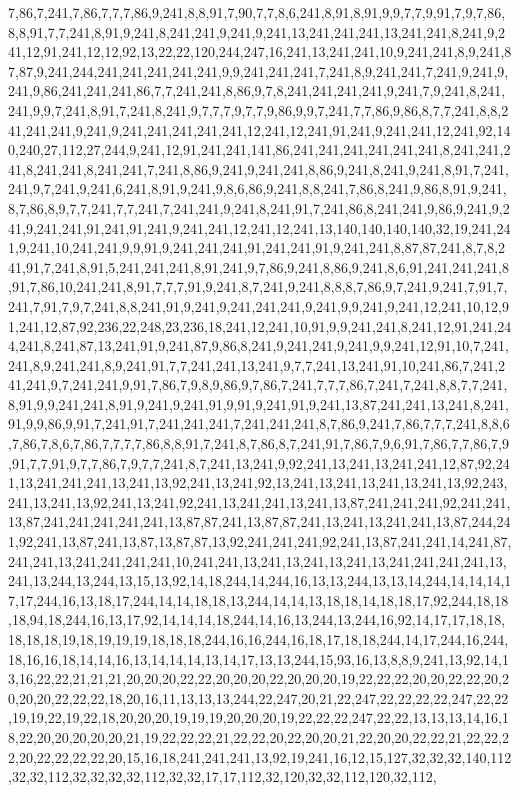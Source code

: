 7,86,7,241,7,86,7,7,7,86,9,241,8,8,91,7,90,7,7,8,6,241,8,91,8,91,9,9,7,7,9,91,7,9,7,86,8,8,91,7,7,241,8,91,9,241,8,241,241,9,241,9,241,13,241,241,241,13,241,241,8,241,9,241,12,91,241,12,12,92,13,22,22,120,244,247,16,241,13,241,241,10,9,241,241,8,9,241,87,87,9,241,244,241,241,241,241,241,9,9,241,241,241,7,241,8,9,241,241,7,241,9,241,9,241,9,86,241,241,241,86,7,7,241,241,8,86,9,7,8,241,241,241,241,9,241,7,9,241,8,241,241,9,9,7,241,8,91,7,241,8,241,9,7,7,7,9,7,7,9,86,9,9,7,241,7,7,86,9,86,8,7,7,241,8,8,241,241,241,9,241,9,241,241,241,241,241,12,241,12,241,91,241,9,241,241,12,241,92,140,240,27,112,27,244,9,241,12,91,241,241,141,86,241,241,241,241,241,241,8,241,241,241,8,241,241,8,241,241,7,241,8,86,9,241,9,241,241,8,86,9,241,8,241,9,241,8,91,7,241,241,9,7,241,9,241,6,241,8,91,9,241,9,8,6,86,9,241,8,8,241,7,86,8,241,9,86,8,91,9,241,8,7,86,8,9,7,7,241,7,7,241,7,241,241,9,241,8,241,91,7,241,86,8,241,241,9,86,9,241,9,241,9,241,241,91,241,91,241,9,241,241,12,241,12,241,13,140,140,140,140,32,19,241,241,9,241,10,241,241,9,9,91,9,241,241,241,91,241,241,91,9,241,241,8,87,87,241,8,7,8,241,91,7,241,8,91,5,241,241,241,8,91,241,9,7,86,9,241,8,86,9,241,8,6,91,241,241,241,8,91,7,86,10,241,241,8,91,7,7,7,91,9,241,8,7,241,9,241,8,8,8,7,86,9,7,241,9,241,7,91,7,241,7,91,7,9,7,241,8,8,241,91,9,241,9,241,241,241,9,241,9,9,241,9,241,12,241,10,12,91,241,12,87,92,236,22,248,23,236,18,241,12,241,10,91,9,9,241,241,8,241,12,91,241,244,241,8,241,87,13,241,91,9,241,87,9,86,8,241,9,241,241,9,241,9,9,241,12,91,10,7,241,241,8,9,241,241,8,9,241,91,7,7,241,241,13,241,9,7,7,241,13,241,91,10,241,86,7,241,241,241,9,7,241,241,9,91,7,86,7,9,8,9,86,9,7,86,7,241,7,7,7,86,7,241,7,241,8,8,7,7,241,8,91,9,9,241,241,8,91,9,241,9,241,91,9,91,9,241,91,9,241,13,87,241,241,13,241,8,241,91,9,9,86,9,91,7,241,91,7,241,241,241,7,241,241,241,8,7,86,9,241,7,86,7,7,7,241,8,8,6,7,86,7,8,6,7,86,7,7,7,7,86,8,8,91,7,241,8,7,86,8,7,241,91,7,86,7,9,6,91,7,86,7,7,86,7,9,91,7,7,91,9,7,7,86,7,9,7,7,241,8,7,241,13,241,9,92,241,13,241,13,241,241,12,87,92,241,13,241,241,241,13,241,13,92,241,13,241,92,13,241,13,241,13,241,13,241,13,92,243,241,13,241,13,92,241,13,241,92,241,13,241,241,13,241,13,87,241,241,241,92,241,241,13,87,241,241,241,241,241,13,87,87,241,13,87,87,241,13,241,13,241,241,13,87,244,241,92,241,13,87,241,13,87,13,87,87,13,92,241,241,241,92,241,13,87,241,241,14,241,87,241,241,13,241,241,241,241,10,241,241,13,241,13,241,13,241,13,241,241,241,241,13,241,13,244,13,244,13,15,13,92,14,18,244,14,244,16,13,13,244,13,13,14,244,14,14,14,17,17,244,16,13,18,17,244,14,14,18,18,13,244,14,14,13,18,18,14,18,18,17,92,244,18,18,18,94,18,244,16,13,17,92,14,14,14,18,244,14,16,13,244,13,244,16,92,14,17,17,18,18,18,18,18,19,18,19,19,19,18,18,18,244,16,16,244,16,18,17,18,18,244,14,17,244,16,244,18,16,16,18,14,14,16,13,14,14,14,13,14,17,13,13,244,15,93,16,13,8,8,9,241,13,92,14,13,16,22,22,21,21,21,20,20,20,22,22,20,20,20,22,20,20,20,19,22,22,22,20,20,22,22,20,20,20,20,22,22,22,18,20,16,11,13,13,13,244,22,247,20,21,22,247,22,22,22,22,247,22,22,19,19,22,19,22,18,20,20,20,19,19,19,20,20,20,19,22,22,22,247,22,22,13,13,13,14,16,18,22,20,20,20,20,20,21,19,22,22,22,21,22,22,20,22,20,20,21,22,20,20,22,22,21,22,22,22,20,22,22,22,22,20,15,16,18,241,241,241,13,92,19,241,16,12,15,127,32,32,32,140,112,32,32,112,32,32,32,32,112,32,32,17,17,112,32,120,32,32,112,120,32,112,